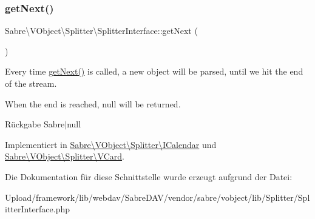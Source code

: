 \subsubsection{\texorpdfstring{get\+Next()}{getNext()}}
{\footnotesize\ttfamily Sabre\textbackslash{}\+V\+Object\textbackslash{}\+Splitter\textbackslash{}\+Splitter\+Interface\+::get\+Next (\begin{DoxyParamCaption}{ }\end{DoxyParamCaption})}

Every time \mbox{\hyperlink{interface_sabre_1_1_v_object_1_1_splitter_1_1_splitter_interface_ae8684178a369fdafebc51e64a5b76ab8}{get\+Next()}} is called, a new object will be parsed, until we hit the end of the stream.

When the end is reached, null will be returned.

\begin{DoxyReturn}{Rückgabe}
Sabre$\vert$null 
\end{DoxyReturn}


Implementiert in \mbox{\hyperlink{class_sabre_1_1_v_object_1_1_splitter_1_1_i_calendar_a966d8ca4940e9327a203ea5e4e1cf101}{Sabre\textbackslash{}\+V\+Object\textbackslash{}\+Splitter\textbackslash{}\+I\+Calendar}} und \mbox{\hyperlink{class_sabre_1_1_v_object_1_1_splitter_1_1_v_card_a0578fdb7544daa2e55d289168eb72292}{Sabre\textbackslash{}\+V\+Object\textbackslash{}\+Splitter\textbackslash{}\+V\+Card}}.



Die Dokumentation für diese Schnittstelle wurde erzeugt aufgrund der Datei\+:\begin{DoxyCompactItemize}
\item 
Upload/framework/lib/webdav/\+Sabre\+D\+A\+V/vendor/sabre/vobject/lib/\+Splitter/Splitter\+Interface.\+php\end{DoxyCompactItemize}
